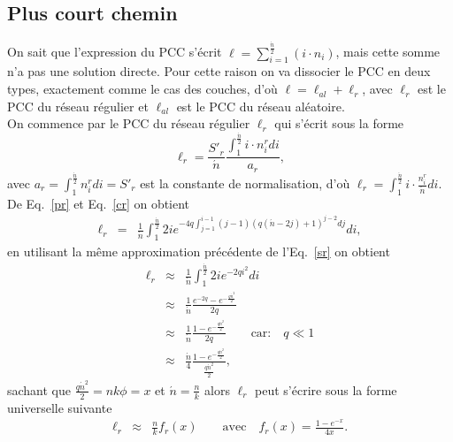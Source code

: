 \subsection{Plus court chemin}
On sait que l'expression du PCC s'écrit  $\ell=\sum_{i=1}^{\frac{\acute{n}}{2}}(i\cdot n_i)$, mais cette somme n'a pas une solution 
directe. Pour cette raison on va dissocier le PCC en deux types, exactement comme le cas des couches, d'où $\ell=\ell_{al}+\ell_r$, avec $\ell_r$ est le PCC du réseau régulier  et $\ell_{al}$ est le PCC du réseau aléatoire.\\
On commence par le PCC du réseau régulier $\ell_r$ qui s'écrit sous la forme 
\begin{equation}
\ell_r=\frac{S'_r}{\acute{n}}\frac{\int_1^{\frac{\acute{n}}{2}}i\cdot n_{i}^{r}di}{a_r},
\end{equation}
avec $a_r=\int_1^{\frac{\acute{n}}{2}}n_{i}^{r}di=S'_r$
est la constante de normalisation, d'où $\ell_r=\int_1^{\frac{\acute{n}}{2}}i\cdot\frac{n_{i}^{r}}{\acute{n}}di$.\\
De Eq.~\eqref{pr} et Eq.~\eqref{cr} on obtient
\begin{eqnarray}
\ell_r&=&\frac{1}{\acute{n}}\int^{\frac{\acute{n}}{2}}_1 2ie^{-4q\int_{j=1}^{i-1}(j-1)(q(\acute{n}-2j)+1)^{j-2}dj}di,\nonumber
\end{eqnarray}
en utilisant la m\^{e}me approximation précédente de l'Eq.~\eqref{sr} on obtient
\begin{eqnarray}
\ell_r &\approx&\frac{1}{\acute{n}}\int_1^{\frac{\acute{n}}{2}}2ie^{-2qi^2}di \\\nonumber
&\approx&\frac{1}{\acute{n}}\frac{e^{-2q}-e^{-\frac{q\acute{n}^2}{2}}}{2q}\\\nonumber
&\approx&\frac{1}{\acute{n}}\frac{1-e^{-\frac{q\acute{n}^2}{2}}}{2q} \quad \quad  \text{car:} \quad q\ll1 \\\nonumber
&\approx&\frac{\acute{n}}{4}\frac{1-e^{-\frac{q\acute{n}^2}{2}}}{\frac{q\acute{n}^2}{2}},\nonumber
\end{eqnarray}
sachant que $\frac{q\acute{n}^2}{2}=nk\phi=x$ et $\acute{n}=\frac{n}{k}$ alors $\ell_r$ peut s'écrire sous la forme universelle suivante
\begin{eqnarray}
\ell_r&\approx&\frac{n}{k}f_r(x) \quad \quad \textrm{avec} \quad f_r(x)=\frac{1-e^{-x}}{4x}.
\label{lr}
\end{eqnarray}

